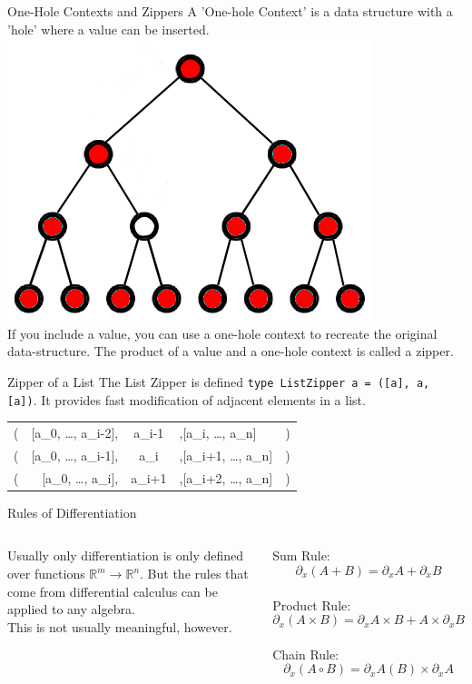 \documentclass[10pt]{beamer}
\begin{document}
\begin{frame}[fragile]{One-Hole Contexts and Zippers}
    \centering
    A 'One-hole Context' is a data structure with a 'hole' where a value can be inserted. \\
    \includegraphics[scale=0.3]{one-hole_context.png} \\
    If you include a value, you can use a one-hole context to recreate the original data-structure. The product of a value and a one-hole context is called a zipper.
\end{frame}


\begin{frame}{Zipper of a List}
	The List Zipper is defined \texttt{type ListZipper a = ([a], a, [a])}. It provides fast modification of adjacent elements in a list.

	\centering
	\begin{tabular}{ r r c l l }
 		(& [a_0, \dots, a_{i-2}],	& \alert{a_{i-1}} 	& ,[a_i, \dots, a_n] &) \\ 
 		(& [a_0, \dots, a_{i-1}],	& \alert{a_i} 		& ,[a_{i+1}, \dots, a_n] &) \\  
		(& [a_0, \dots, a_i], 		& \alert{a_{i+1}} 	& ,[a_{i+2}, \dots, a_n] &)    
	\end{tabular}
\end{frame}


\begin{frame}[fragile]{Rules of Differentiation}
    \begin{columns}
    Usually only differentiation is only defined over functions $ \mathbb{R}^m \rightarrow \mathbb{R}^n $. But the rules that come from differential calculus can be applied to any algebra. \\
    This is not usually meaningful, however.
    

    Sum Rule:
    $$ \partial_x (A+B) = \partial_x A +  \partial_x B $$ \\
    
    Product Rule:
    $$ \partial_x (A \times B) = \partial_x A \times B + A \times \partial_x B $$ \\

    Chain Rule:
    $$ \partial_x (A \circ B) = \partial_x A (B) \times \partial_x A $$

    \end{columns}
\end{frame}
\end{document}
